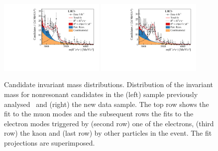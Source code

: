 \begin{figure}
    \includegraphics[width=0.45\textwidth]{figures/Fig6g.pdf}
    \includegraphics[width=0.45\textwidth]{figures/Fig6h.pdf}
    \caption{Candidate invariant mass distributions. Distribution of the invariant mass \mKll for nonresonant candidates in the (left) sample previously analysed~\cite{LHCb-PAPER-2019-009} and (right) the new data sample. The top row shows the fit to the muon modes and the subsequent rows the fits to the electron modes triggered by (second row) one of the electrons, (third row) the kaon and (last row) by other particles in the event. The fit projections are superimposed.
    }
    \label{fig:nonresfits_categories}
\end{figure}


